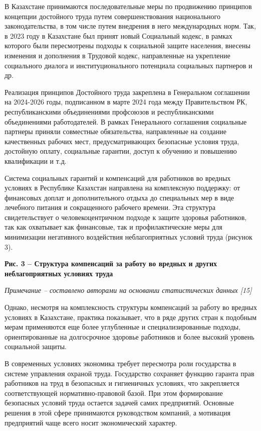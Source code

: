 В Казахстане принимаются последовательные меры по продвижению принципов
концепции достойного труда путем совершенствования национального
законодательства, в том числе путем внедрения в него международных норм.
Так, в 2023 году в Казахстане был принят новый Социальный кодекс, в
рамках которого были пересмотрены подходы к социальной защите населения,
внесены изменения и дополнения в Трудовой кодекс, направленные на
укрепление социального диалога и институционального потенциала
социальных партнеров и др.

Реализация принципов Достойного труда закреплена в Генеральном
соглашении на 2024-2026 годы, подписанном в марте 2024 года между
Правительством РК, республиканскими объединениями профсоюзов и
республиканскими объединениями работодателей. В рамках Генерального
соглашения социальные партнеры приняли совместные обязательства,
направленные на создание качественных рабочих мест, предусматривающих
безопасные условия труда, достойную оплату, социальные гарантии, доступ
к обучению и повышению квалификации и т.д.

Система социальных гарантий и компенсаций для работников во вредных
условиях в Республике Казахстан направлена на комплексную поддержку: от
финансовых доплат и дополнительного отдыха до специальных мер в виде
лечебного питания и сокращенного рабочего времени. Эта структура
свидетельствует о человекоцентричном подходе к защите здоровья
работников, так как охватывает как финансовые, так и профилактические
меры для минимизации негативного воздействия неблагоприятных условий
труда (рисунок 3).

{\bfseries Рис. 3 -- Структура компенсаций за работу во вредных и других
неблагоприятных условиях труда}

\emph{Примечание -- составлено авторами на основании статистических
данных {[}15{]}}

Однако, несмотря на комплексность структуры компенсаций за работу во
вредных условиях в Казахстане, практика показывает, что в ряде других
стран к подобным мерам применяются еще более углубленные и
специализированные подходы, ориентированные на долгосрочное здоровье
работников и более высокий уровень социальной защиты.

В современных условиях экономика требует пересмотра роли государства в
системе управления охраной труда. Государство сохраняет функцию гаранта
прав работников на труд в безопасных и гигиеничных условиях, что
закрепляется соответствующей нормативно-правовой базой. При этом
формирование безопасных условий труда остается задачей самих
предприятий. Основные решения в этой сфере принимаются руководством
компаний, а мотивация предприятий чаще всего носит экономический
характер.

